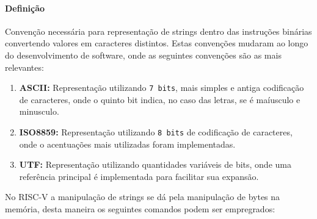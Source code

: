 \documentclass{article}
\begin{document}
            \paragraph{Definição}Convenção necessária para representação de strings dentro das instruções binárias convertendo valores em caracteres distintos. Estas convenções mudaram ao longo do desenvolvimento de software, onde as seguintes convenções são as mais relevantes:
                \begin{enumerate}[rightmargin = \leftmargin]
                    \item \textbf{ASCII:} Representação utilizando \texttt{7 bits}, mais simples e antiga codificação de caracteres, onde o quinto bit indica, no caso das letras, se é maíusculo e minusculo.
                    \item \textbf{ISO8859:} Representação utilizando \texttt{8 bits} de codificação de caracteres, onde o acentuações mais utilizadas foram implementadas.
                    \item \textbf{UTF:} Representação utilizando quantidades variáveis de bits, onde uma referência principal é implementada para facilitar sua expansão.
                \end{enumerate}
            No RISC-V a manipulação de strings se dá pela manipulação de bytes na memória, desta maneira os seguintes comandos podem ser empregrados:
\end{document}
